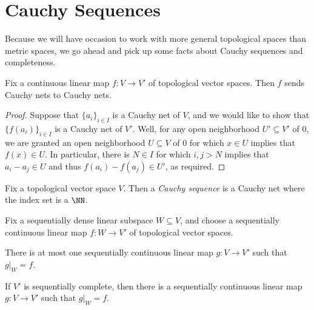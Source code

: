 \documentclass[notes.tex]{subfiles}
\begin{document}
\section{Cauchy Sequences}
Because we will have occasion to work with more general topological spaces than metric spaces, we go ahead and pick up some facts about Cauchy sequences and completeness.
\begin{lemma} \label{lem:uniform-cont-is-cauchy-cont}
	Fix a continuous linear map $f\colon V\to V'$ of topological vector spaces. Then $f$ sends Cauchy nets to Cauchy nets.
\end{lemma}
\begin{proof}
	Suppose that $\{a_i\}_{i\in I}$ is a Cauchy net of $V$, and we would like to show that $\{f(a_i)\}_{i\in I}$ is a Cauchy net of $V'$. Well, for any open neighborhood $U'\subseteq V'$ of $0$, we are granted an open neighborhood $U\subseteq V$ of $0$ for which $x\in U$ implies that $f(x)\in U$. In particular, there is $N\in I$ for which $i,j>N$ implies that $a_i-a_j\in U$ and thus $f(a_i)-f(a_j)\in U'$, as required.
\end{proof}
\begin{definition}
	Fix a topological vector space $V$. Then a \textit{Cauchy sequence} is a Cauchy net where the index set is a $\NN$.
\end{definition}
\begin{proposition} \label{prop:extend-cont}
	Fix a sequentially dense linear subspace $W\subseteq V$, and choose a sequentially continuous linear map $f\colon W\to V'$ of topological vector spaces.
	\begin{listalph}
		\item There is at most one sequentially continuous linear map $g\colon V\to V'$ such that $g|_W=f$.
		\item If $V'$ is sequentially complete, then there is a sequentially continuous linear map $g\colon V\to V'$ such that $g|_W=f$.
	\end{listalph}
\end{proposition}
\end{document}
